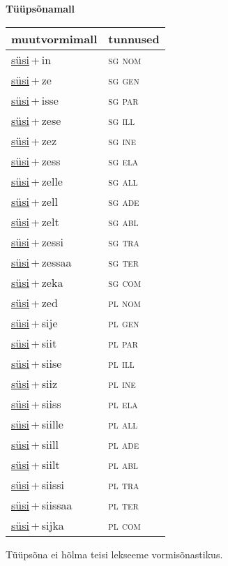 
\vspace{1.8em}
\begin{minipage}{\textwidth}
\textbf{Tüüpsõnamall \,}\\

\begin{sideways}
\begin{tabular}{l l}
muutvormimall & tunnused \\
\hline
\underline{süsi}\,+\,in & \textsc{ sg nom } \\
\underline{süsi}\,+\,ze & \textsc{ sg gen } \\
\underline{süsi}\,+\,isse & \textsc{ sg par } \\
\underline{süsi}\,+\,zese & \textsc{ sg ill } \\
\underline{süsi}\,+\,zez & \textsc{ sg ine } \\
\underline{süsi}\,+\,zess & \textsc{ sg ela } \\
\underline{süsi}\,+\,zelle & \textsc{ sg all } \\
\underline{süsi}\,+\,zell & \textsc{ sg ade } \\
\underline{süsi}\,+\,zelt & \textsc{ sg abl } \\
\underline{süsi}\,+\,zessi & \textsc{ sg tra } \\
\underline{süsi}\,+\,zessaa & \textsc{ sg ter } \\
\underline{süsi}\,+\,zeka & \textsc{ sg com } \\
\underline{süsi}\,+\,zed & \textsc{ pl nom } \\
\underline{süsi}\,+\,sije & \textsc{ pl gen } \\
\underline{süsi}\,+\,siit & \textsc{ pl par } \\
\underline{süsi}\,+\,siise & \textsc{ pl ill } \\
\underline{süsi}\,+\,siiz & \textsc{ pl ine } \\
\underline{süsi}\,+\,siiss & \textsc{ pl ela } \\
\underline{süsi}\,+\,siille & \textsc{ pl all } \\
\underline{süsi}\,+\,siill & \textsc{ pl ade } \\
\underline{süsi}\,+\,siilt & \textsc{ pl abl } \\
\underline{süsi}\,+\,siissi & \textsc{ pl tra } \\
\underline{süsi}\,+\,siissaa & \textsc{ pl ter } \\
\underline{süsi}\,+\,sijka & \textsc{ pl com } \\
\end{tabular}
\end{sideways}
\label{tab:tüüpsõnamall-süsiin}

\end{minipage}

 
\vspace{1em}
\noindent Tüüpsõna ei hõlma teisi lekseeme vormi\-sõnastikus.
